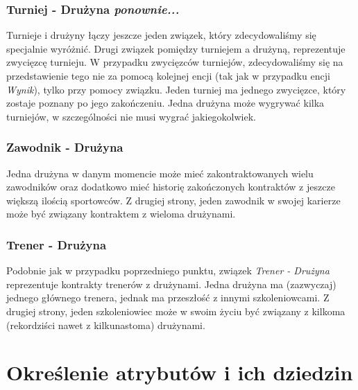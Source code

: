 \documentclass{mwrep}
\begin{document}
\subsubsection{Turniej - Drużyna \emph{ponownie...}}
Turnieje i drużyny łączy jeszcze jeden związek, który zdecydowaliśmy się specjalnie wyróżnić. Drugi związek pomiędzy turniejem a drużyną, reprezentuje zwycięzcę turnieju. W przypadku zwycięzców turniejów, 
zdecydowaliśmy się na przedstawienie tego nie za pomocą kolejnej encji (tak jak w przypadku encji \emph{Wynik}), tylko 
przy pomocy związku. Jeden turniej ma jednego zwycięzce, który zostaje poznany po jego zakończeniu. Jedna drużyna może wygrywać kilka turniejów,
w szczególności nie musi wygrać jakiegokolwiek.


\subsubsection{Zawodnik - Drużyna}
Jedna drużyna w danym momencie może mieć zakontraktowanych wielu zawodników oraz dodatkowo mieć historię zakończonych kontraktów z 
jeszcze większą ilością sportowców. Z drugiej strony, jeden zawodnik w swojej karierze może być związany
kontraktem z wieloma drużynami. 


\subsubsection{Trener - Drużyna}
Podobnie jak w przypadku poprzedniego punktu, związek \emph{Trener - Drużyna} reprezentuje kontrakty trenerów z drużynami.
Jedna drużyna ma (zazwyczaj) jednego głównego trenera, jednak ma przeszłość z innymi szkoleniowcami. Z drugiej strony, jeden szkoleniowiec
może w swoim życiu być związany z kilkoma (rekordziści nawet z kilkunastoma) drużynami. 

\newpage

\section{Określenie atrybutów i ich dziedzin}
\vspace{1.5cm}
\end{document}
